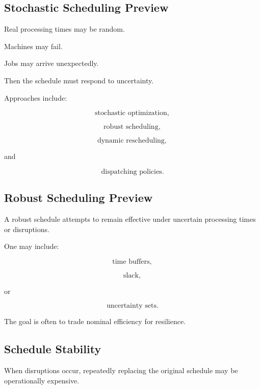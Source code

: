 \subsection{Stochastic Scheduling Preview}
\label{subsec:stochastic-scheduling-preview}

Real processing times may be random.

Machines may fail.

Jobs may arrive unexpectedly.

Then the schedule must respond to uncertainty.

Approaches include:

\[
\boxed{
\text{stochastic optimization},
}
\]

\[
\boxed{
\text{robust scheduling},
}
\]

\[
\boxed{
\text{dynamic rescheduling},
}
\]

and

\[
\boxed{
\text{dispatching policies}.
}
\]

\subsection{Robust Scheduling Preview}
\label{subsec:robust-scheduling-preview}

A robust schedule attempts to remain effective under uncertain processing
times or disruptions.

One may include:

\[
\boxed{
\text{time buffers},
}
\]

\[
\boxed{
\text{slack},
}
\]

or

\[
\boxed{
\text{uncertainty sets}.
}
\]

The goal is often to trade nominal efficiency for resilience.

\subsection{Schedule Stability}
\label{subsec:schedule-stability}

When disruptions occur, repeatedly replacing the original schedule may be
operationally expensive.

